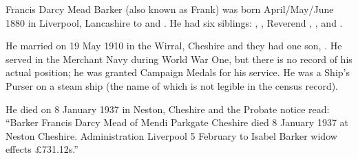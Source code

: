 
Francis Darcy Mead Barker (also known as Frank) was born April/May/June 1880 in Liverpool, Lancashire to  and .\cite{FBarkerBirth}
He had six siblings: , , Reverend , ,  and .

He married  on 19 May 1910 in the Wirral, Cheshire \cite{FBarkerMarriage} and they had one son, .
He served in the Merchant Navy during World War One, but there is no record of his actual position;  he was granted Campaign Medals for his service. \cite{FDMBarkerMedals}
He was a Ship's Purser on a steam ship (the name of which is not legible in the census record). \cite{FBarkerOccupation}

He died on 8 January 1937 in Neston, Cheshire \cite{FBarkerDeath} and the Probate notice read:
``Barker Francis Darcy Mead of Mendi Parkgate Cheshire died 8 January 1937 at Neston Cheshire.
Administration Liverpool 5 February to Isabel Barker widow effects \pounds 731.12s.''
